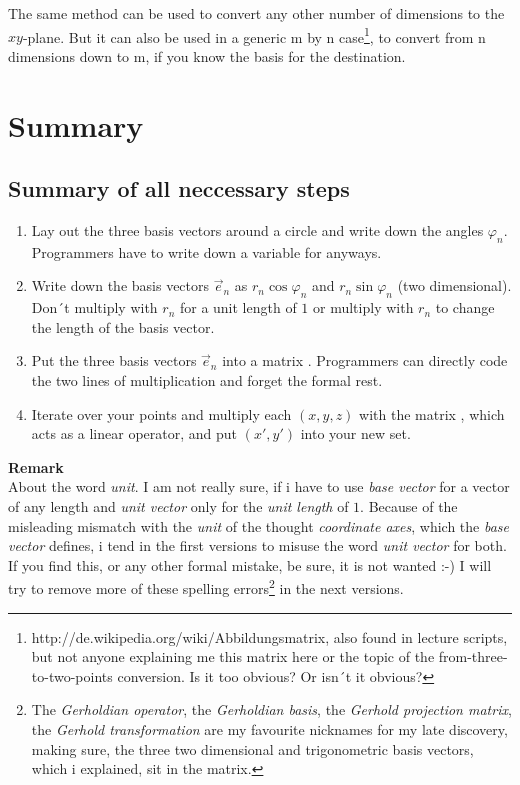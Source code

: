 \documentclass[a4paper]{article}
\begin{document}
The same method can be used to convert any other number of dimensions to the $xy$-plane. But it can also be
used in a generic m by n case\footnote{http://de.wikipedia.org/wiki/Abbildungsmatrix, also found in lecture scripts, but not anyone explaining me this matrix here or the topic of the from-three-to-two-points conversion. Is it too obvious? Or isn´t it obvious?}, to convert from n dimensions down to m, if you know the basis for the destination.\\

\section{Summary}

\subsection{Summary of all neccessary steps}
\begin{enumerate}
\item Lay out the three basis vectors around a circle and write down the angles $\varphi_n$. Programmers have to write down a variable for anyways.
\item Write down the basis vectors $\vec{e}_n$ as $r_n \cos \varphi_n$ and $r_n \sin \varphi_n$ (two dimensional). Don´t multiply with $r_n$ for a unit length of $1$ or multiply with $r_n$ to change the length of the basis vector.
\item Put the three basis vectors $\vec{e}_n$ into a matrix . Programmers can directly code the two lines of multiplication and forget the formal rest.
\item Iterate over your points and multiply each $(x,y,z)$ with the matrix , which acts as a linear operator, and put $(x',y')$ into your new set.
\end{enumerate}

\textbf{Remark}\\
About the word \emph{unit}. I am not really sure, if i have to use \emph{base vector} for a vector of any length and \emph{unit vector} only for the \emph{unit length} of $1$. Because of the misleading mismatch with the \emph{unit} of the thought \emph{coordinate axes}, which the \emph{base vector} defines, i tend in the first versions to misuse the word \emph{unit vector} for both. If you find this, or any other formal mistake, be sure, it is not wanted :-) I will try to remove more of these spelling errors\footnote{The \emph{Gerholdian operator}, the \emph{Gerholdian basis}, the \emph{Gerhold projection matrix}, the \emph{Gerhold transformation} are my favourite nicknames for my late discovery, making sure, the three two dimensional and trigonometric basis vectors, which i explained, sit in the matrix.} in the next versions.
\end{document}

